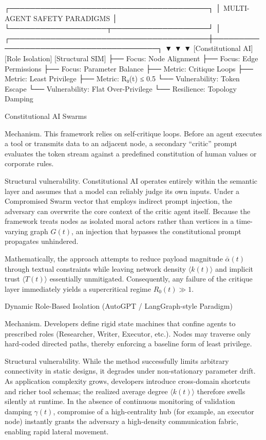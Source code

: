                              ┌───────────────────────────────────────┐
                             │       MULTI-AGENT SAFETY PARADIGMS    │
                             └───────────────────┬───────────────────┘
                                                 │
         ┌───────────────────────────────────────┼───────────────────────────────────────┐
         ▼                                       ▼                                       ▼
  [Constitutional AI]                     [Role Isolation]                       [Structural SIM]
 ├── Focus: Node Alignment               ├── Focus: Edge Permissions            ├── Focus: Parameter Balance
 ├── Metric: Critique Loops              ├── Metric: Least Privilege            ├── Metric: R₀(t) ≤ 0.5
 └── Vulnerability: Token Escape         └── Vulnerability: Flat Over-Privilege └── Resilience: Topology Damping

Constitutional AI Swarms

Mechanism.  
This framework relies on self-critique loops. Before an agent executes a tool or transmits data to an adjacent node, a secondary “critic” prompt evaluates the token stream against a predefined constitution of human values or corporate rules.

Structural vulnerability.  
Constitutional AI operates entirely within the semantic layer and assumes that a model can reliably judge its own inputs. Under a Compromised Swarm vector that employs indirect prompt injection, the adversary can overwrite the core context of the critic agent itself. Because the framework treats nodes as isolated moral actors rather than vertices in a time-varying graph \(G(t)\), an injection that bypasses the constitutional prompt propagates unhindered.  

Mathematically, the approach attempts to reduce payload magnitude \(\bar{\alpha}(t)\) through textual constraints while leaving network density \(\langle k(t)\rangle\) and implicit trust \(\langle T(t)\rangle\) essentially unmitigated. Consequently, any failure of the critique layer immediately yields a supercritical regime \(R_0(t)\gg 1\).

Dynamic Role-Based Isolation (AutoGPT / LangGraph-style Paradigm)

Mechanism.  
Developers define rigid state machines that confine agents to prescribed roles (Researcher, Writer, Executor, etc.). Nodes may traverse only hard-coded directed paths, thereby enforcing a baseline form of least privilege.

Structural vulnerability.  
While the method successfully limits arbitrary connectivity in static designs, it degrades under non-stationary parameter drift. As application complexity grows, developers introduce cross-domain shortcuts and richer tool schemas; the realized average degree \(\langle k(t)\rangle\) therefore swells silently at runtime. In the absence of continuous monitoring of validation damping \(\gamma(t)\), compromise of a high-centrality hub (for example, an executor node) instantly grants the adversary a high-density communication fabric, enabling rapid lateral movement.

